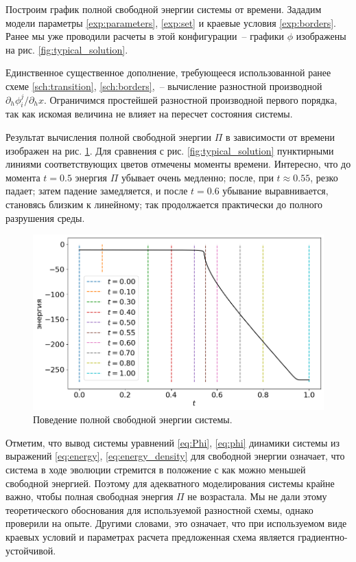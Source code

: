 Построим график полной свободной энергии системы от времени. Зададим модели параметры \eqref{exp:parameters}, \eqref{exp:set} и краевые условия \eqref{exp:borders}. Ранее мы уже проводили расчеты в этой конфигурации~-- графики $\phi$ изображены на рис. \ref{fig:typical_solution}.

Единственное существенное дополнение, требующееся использованной ранее схеме \eqref{sch:transition}, \eqref{sch:borders},~-- вычисление разностной производной $\partial_h \phi_i^j / \partial_h x$. Ограничимся простейшей разностной производной первого порядка, так как искомая величина не влияет на пересчет состояния системы.

Результат вычисления полной свободной энергии $\Pi$ в зависимости от времени изображен на рис. \ref{fig:energy}. Для сравнения с рис. \ref{fig:typical_solution} пунктирными линиями соответствующих цветов отмечены моменты времени. Интересно, что до момента $t = 0.5$ энергия $\Pi$ убывает очень медленно; после, при $t \approx 0.55$, резко падает; затем падение замедляется, и после $t = 0.6$ убывание выравнивается, становясь близким к линейному; так продолжается практически до полного разрушения среды.

\begin{figure}
	\centering
	\includegraphics[width=\textwidth]{figures/energy_total.png}
	\vspace{-0.6cm}
	\caption{Поведение полной свободной энергии системы.}
	\label{fig:energy}
\end{figure}

Отметим, что вывод системы уравнений \eqref{eq:Phi}, \eqref{eq:phi} динамики системы из выражений \eqref{eq:energy}, \eqref{eq:energy_density} для свободной энергии означает, что система в ходе эволюции стремится в положение с как можно меньшей свободной энергией. Поэтому для адекватного моделирования системы крайне важно, чтобы полная свободная энергия $\Pi$ не возрастала. Мы не дали этому теоретического обоснования для используемой разностной схемы, однако проверили на опыте. Другими словами, это означает, что при используемом виде краевых условий и параметрах расчета предложенная схема является градиентно-устойчивой.
